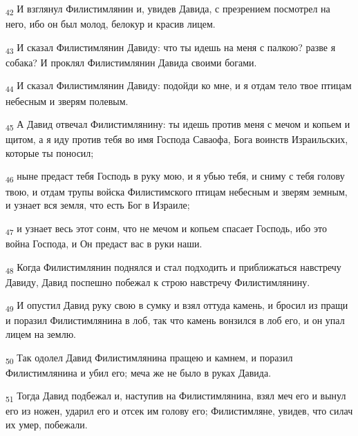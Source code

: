 \begin{tcolorbox}
\textsubscript{42} И взглянул Филистимлянин и, увидев Давида, с презрением посмотрел на него, ибо он был молод, белокур и красив лицем.
\end{tcolorbox}
\begin{tcolorbox}
\textsubscript{43} И сказал Филистимлянин Давиду: что ты идешь на меня с палкою? разве я собака? И проклял Филистимлянин Давида своими богами.
\end{tcolorbox}
\begin{tcolorbox}
\textsubscript{44} И сказал Филистимлянин Давиду: подойди ко мне, и я отдам тело твое птицам небесным и зверям полевым.
\end{tcolorbox}
\begin{tcolorbox}
\textsubscript{45} А Давид отвечал Филистимлянину: ты идешь против меня с мечом и копьем и щитом, а я иду против тебя во имя Господа Саваофа, Бога воинств Израильских, которые ты поносил;
\end{tcolorbox}
\begin{tcolorbox}
\textsubscript{46} ныне предаст тебя Господь в руку мою, и я убью тебя, и сниму с тебя голову твою, и отдам трупы войска Филистимского птицам небесным и зверям земным, и узнает вся земля, что есть Бог в Израиле;
\end{tcolorbox}
\begin{tcolorbox}
\textsubscript{47} и узнает весь этот сонм, что не мечом и копьем спасает Господь, ибо это война Господа, и Он предаст вас в руки наши.
\end{tcolorbox}
\begin{tcolorbox}
\textsubscript{48} Когда Филистимлянин поднялся и стал подходить и приближаться навстречу Давиду, Давид поспешно побежал к строю навстречу Филистимлянину.
\end{tcolorbox}
\begin{tcolorbox}
\textsubscript{49} И опустил Давид руку свою в сумку и взял оттуда камень, и бросил из пращи и поразил Филистимлянина в лоб, так что камень вонзился в лоб его, и он упал лицем на землю.
\end{tcolorbox}
\begin{tcolorbox}
\textsubscript{50} Так одолел Давид Филистимлянина пращею и камнем, и поразил Филистимлянина и убил его; меча же не было в руках Давида.
\end{tcolorbox}
\begin{tcolorbox}
\textsubscript{51} Тогда Давид подбежал и, наступив на Филистимлянина, взял меч его и вынул его из ножен, ударил его и отсек им голову его; Филистимляне, увидев, что силач их умер, побежали.
\end{tcolorbox}
